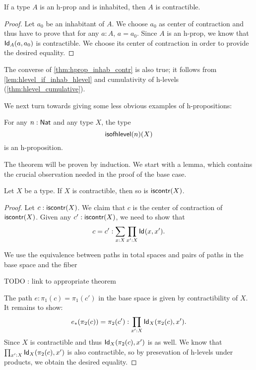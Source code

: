 \begin{thm}\label{thm:hprop_inhab_contr}
 If a type $A$ is an h-prop and is inhabited, then $A$ is contractible.
\end{thm}

\begin{proof}
 Let $a_0$ be an inhabitant of $A$. We choose $a_0$ as center of contraction and thus have to
  prove that for any $a : A$, $a = a_0$.
  Since $A$ is an h-prop, we know that $\idtype[A]{a}{a_0}$ is contractible.
  We choose its center of contraction in order to provide the desired equality.
\end{proof}

\begin{rmk}
 The converse of \autoref{thm:hprop_inhab_contr} is also true; it follows from \autoref{lem:hlevel_if_inhab_hlevel} and cumulativity of h-levels (\autoref{thm:hlevel_cumulative}).
\end{rmk}

We next turn towards giving some less obvious examples of h-propositions:

\begin{thm}\label{thm:isaprop_isofhlevel}
 For any $n : \Nat$ and any type $X$, the type
 \[ \isofhlevel(n)(X) \]
 is an h-proposition.
\end{thm}

The theorem will be proven by induction. We start with a lemma, which contains the crucial observation needed in the proof of the base case.

\begin{lem}\label{lem:contr_contr_is_contr}
  Let $X$ be a type. If $X$ is contractible, then so is $\iscontr(X)$.
\end{lem}

\begin{proof}
 Let $c : \iscontr(X)$. We claim that $c$ is the center of contraction of $\iscontr (X)$.
  Given any $c' : \iscontr (X)$, we need to show that
       \[ c = c' : \sum_{x:X}\prod_{x':X}\idtype{x}{x'}  . \]

 We use the equivalence between paths in total spaces and pairs of paths in the base space and the fiber

 TODO : link to appropriate theorem

 The path $e : \pi_1(c) = \pi_1 (c')$ in the base space is given by contractibility of $X$.
 It remains to show:
 \[ \trans{e}{\pi_2(c)} = \pi_2 (c') : \prod_{x' : X} \idtype[X]{\pi_2 (c)} {x'}  .  \]
 Since $X$ is contractible and thus $\idtype[X]{\pi_2 (c)} {x'}$ is as well.
 We know that $\prod_{x' : X} \idtype[X]{\pi_2 (c)} {x'}$
 is also contractible, so by presevation of h-levels under products, we obtain the desired equality.
\end{proof}

